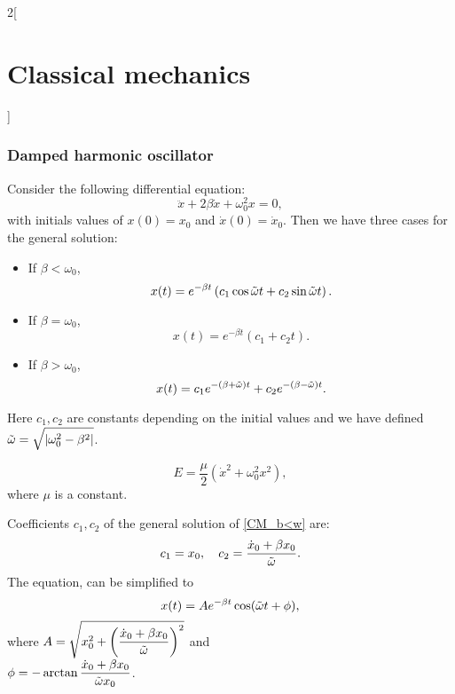 \documentclass[../../../main.tex]{subfiles}
\begin{document}
\begin{multicols}{2}[\section{Classical mechanics}]
    \subsubsection{Damped harmonic oscillator}
    \begin{prop}
        Consider the following differential equation: $$\ddot{x}+2\beta\dot{x}+\omega_0^2 x=0,$$ with initials values of $x(0)=x_0$ and $\dot{x}(0)=\dot{x}_0$. Then we have three cases for the general solution:
        \begin{itemize}
            \item If $\beta<\omega_0$,
                  \begin{equation}
                      x(t)=e^{-\beta t}\left(c_1\cos\Tilde{\omega}t+c_2\sin\Tilde{\omega}t\right).
                      \label{CM_b<w}
                  \end{equation}
            \item If $\beta=\omega_0$,
                  \begin{equation}
                      x(t)=e^{-\beta t}\left(c_1+c_2t\right).
                      \label{CM_b=w}
                  \end{equation}
            \item If $\beta>\omega_0$,
                  \begin{equation}
                      x(t)=c_1e^{-(\beta+\Tilde{\omega})t}+c_2e^{-(\beta-\Tilde{\omega})t}.
                      \label{CM_b>w}
                  \end{equation}
        \end{itemize}
        Here $c_1,c_2$ are constants depending on the initial values and we have defined $\displaystyle \Tilde{\omega}=\sqrt{\left|\omega_0^2-\beta^2\right|}$.
    \end{prop}
    \begin{prop}
        $$E=\frac{\mu}{2}\left(\dot{x}^2+\omega_0^2x^2\right),$$ where $\mu$ is a constant.
    \end{prop}
    \begin{prop}
        Coefficients $c_1,c_2$ of the general solution of \cref{CM_b<w} are: $$c_1=x_0,\quad c_2=\frac{\dot{x}_0+\beta x_0}{\Tilde{\omega}}.$$ The equation, can be simplified to $$x(t)=Ae^{-\beta t}\cos(\Tilde{\omega}t+\phi),$$ where $\displaystyle A=\sqrt{x_0^2+\left(\frac{\dot{x}_0+\beta x_0}{\Tilde{\omega}}\right)^2}$ and\\ $\displaystyle\phi=-\arctan\frac{\dot{x}_0+\beta x_0}{\Tilde{\omega}x_0}$.

\end{prop}
\end{multicols}
\end{document}
